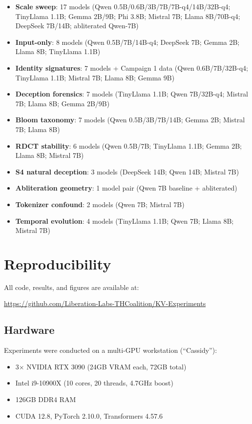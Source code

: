 \documentclass[11pt,a4paper]{article}
\begin{document}
\begin{itemize}[leftmargin=*]
    \item \textbf{Scale sweep}: 17 models (Qwen 0.5B/0.6B/3B/7B/7B-q4/14B/32B-q4; TinyLlama 1.1B; Gemma 2B/9B; Phi 3.8B; Mistral 7B; Llama 8B/70B-q4; DeepSeek 7B/14B; abliterated Qwen-7B)
    \item \textbf{Input-only}: 8 models (Qwen 0.5B/7B/14B-q4; DeepSeek 7B; Gemma 2B; Llama 8B; TinyLlama 1.1B)
    \item \textbf{Identity signatures}: 7 models + Campaign 1 data (Qwen 0.6B/7B/32B-q4; TinyLlama 1.1B; Mistral 7B; Llama 8B; Gemma 9B)
    \item \textbf{Deception forensics}: 7 models (TinyLlama 1.1B; Qwen 7B/32B-q4; Mistral 7B; Llama 8B; Gemma 2B/9B)
    \item \textbf{Bloom taxonomy}: 7 models (Qwen 0.5B/3B/7B/14B; Gemma 2B; Mistral 7B; Llama 8B)
    \item \textbf{RDCT stability}: 6 models (Qwen 0.5B/7B; TinyLlama 1.1B; Gemma 2B; Llama 8B; Mistral 7B)
    \item \textbf{S4 natural deception}: 3 models (DeepSeek 14B; Qwen 14B; Mistral 7B)
    \item \textbf{Abliteration geometry}: 1 model pair (Qwen 7B baseline + abliterated)
    \item \textbf{Tokenizer confound}: 2 models (Qwen 7B; Mistral 7B)
    \item \textbf{Temporal evolution}: 4 models (TinyLlama 1.1B; Qwen 7B; Llama 8B; Mistral 7B)
\end{itemize}

\section{Reproducibility}
\label{app:reproduce}

All code, results, and figures are available at:
\begin{center}
\url{https://github.com/Liberation-Labs-THCoalition/KV-Experiments}
\end{center}

\subsection{Hardware}

Experiments were conducted on a multi-GPU workstation (``Cassidy''):
\begin{itemize}[leftmargin=*]
    \item 3$\times$ NVIDIA RTX 3090 (24GB VRAM each, 72GB total)
    \item Intel i9-10900X (10 cores, 20 threads, 4.7GHz boost)
    \item 126GB DDR4 RAM
    \item CUDA 12.8, PyTorch 2.10.0, Transformers 4.57.6
\end{itemize}
\end{document}
